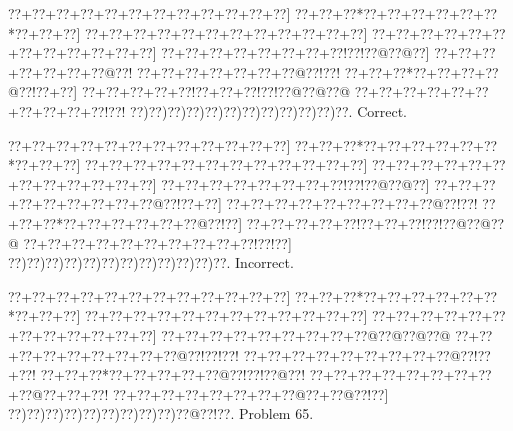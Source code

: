 \documentclass[a5paper]{article}
\begin{document}
\begin{center}
{\goo
\0??+\0??+\0??+\0??+\0??+\0??+\0??+\0??+\0??+\0??+\0??+\0??]
\0??+\0??+\0??*\0??+\0??+\0??+\0??+\0??+\0??*\0??+\0??+\0??]
\0??+\0??+\0??+\0??+\0??+\0??+\0??+\0??+\0??+\0??+\0??+\0??]
\0??+\0??+\0??+\0??+\0??+\0??+\0??+\0??+\0??+\0??+\0??+\0??]
\0??+\0??+\0??+\0??+\0??+\0??+\0??+\0??!\0??!\0??@\0??@\0??]
\0??+\0??+\0??+\0??+\0??+\0??+\0??@\0??!
\0??+\0??+\0??+\0??+\0??+\0??+\0??@\0??!\0??!
\0??+\0??+\0??*\0??+\0??+\0??+\0??@\0??!\0??+\0??]
\0??+\0??+\0??+\0??+\0??!\0??+\0??+\0??!\0??!\0??@\0??@\0??@
\0??+\0??+\0??+\0??+\0??+\0??+\0??+\0??+\0??+\0??!\0??!
\0??)\0??)\0??)\0??)\0??)\0??)\0??)\0??)\0??)\0??)\0??)\0??.
}
Correct. 

\end{center}
\begin{center}
{\goo
\0??+\0??+\0??+\0??+\0??+\0??+\0??+\0??+\0??+\0??+\0??+\0??]
\0??+\0??+\0??*\0??+\0??+\0??+\0??+\0??+\0??*\0??+\0??+\0??]
\0??+\0??+\0??+\0??+\0??+\0??+\0??+\0??+\0??+\0??+\0??+\0??]
\0??+\0??+\0??+\0??+\0??+\0??+\0??+\0??+\0??+\0??+\0??+\0??]
\0??+\0??+\0??+\0??+\0??+\0??+\0??+\0??!\0??!\0??@\0??@\0??]
\0??+\0??+\0??+\0??+\0??+\0??+\0??+\0??+\0??@\0??!\0??+\0??]
\0??+\0??+\0??+\0??+\0??+\0??+\0??+\0??+\0??@\0??!\0??!
\0??+\0??+\0??*\0??+\0??+\0??+\0??+\0??+\0??@\0??!\0??]
\0??+\0??+\0??+\0??+\0??!\0??+\0??+\0??!\0??!\0??@\0??@\0??@
\0??+\0??+\0??+\0??+\0??+\0??+\0??+\0??+\0??+\0??!\0??!\0??]
\0??)\0??)\0??)\0??)\0??)\0??)\0??)\0??)\0??)\0??)\0??)\0??.
}
Incorrect. 

\end{center}
\newpage
\begin{center}
{\goo
\0??+\0??+\0??+\0??+\0??+\0??+\0??+\0??+\0??+\0??+\0??+\0??]
\0??+\0??+\0??*\0??+\0??+\0??+\0??+\0??+\0??*\0??+\0??+\0??]
\0??+\0??+\0??+\0??+\0??+\0??+\0??+\0??+\0??+\0??+\0??+\0??]
\0??+\0??+\0??+\0??+\0??+\0??+\0??+\0??+\0??+\0??+\0??+\0??]
\0??+\0??+\0??+\0??+\0??+\0??+\0??+\0??+\0??@\0??@\0??@\0??@
\0??+\0??+\0??+\0??+\0??+\0??+\0??+\0??+\0??@\0??!\0??!\0??!
\0??+\0??+\0??+\0??+\0??+\0??+\0??+\0??+\0??@\0??!\0??+\0??!
\0??+\0??+\0??*\0??+\0??+\0??+\0??+\0??@\0??!\0??!\0??@\0??!
\0??+\0??+\0??+\0??+\0??+\0??+\0??+\0??+\0??@\0??+\0??+\0??!
\0??+\0??+\0??+\0??+\0??+\0??+\0??+\0??@\0??+\0??@\0??!\0??]
\0??)\0??)\0??)\0??)\0??)\0??)\0??)\0??)\0??)\0??@\0??!\0??.
}
Problem 65.

\end{center}
\end{document}
